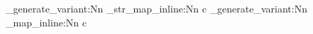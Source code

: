 %

%
%
%
%
%


\usepackage{expl3}
\usepackage{xparse}
\usepackage{forloop}

\ExplSyntaxOn
\cs_generate_variant:Nn \ior_str_map_inline:Nn { c } 
\cs_generate_variant:Nn \ior_map_inline:Nn { c }

